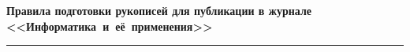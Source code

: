 \def\stat{cont-rus}
{%
\vspace*{-24pt}
\raggedleft\Large \bf%
Правила подготовки рукописей  для публикации в журнале
<<Информатика~и~её~применения>> \vskip 8pt
    \hrule
    \par
{} }

\label{st\stat}

\def\tit{\ }

\def\aut{\ }
\def\auf{\ }

\def\leftkol{\ }

\def\rightkol{\ }


\titele{\tit}{\aut}{\auf}{\leftkol}{\rightkol}


